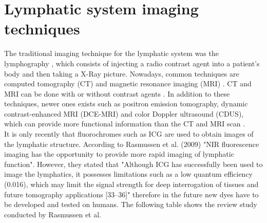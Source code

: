 \section{Lymphatic system imaging techniques}
The traditional imaging technique for the lymphatic system was the lymphography \cite{guermazi_lymphography:_2003}, which consists of injecting a radio contrast agent into a patient's body and then taking a X-Ray picture.  Nowadays, common techniques are computed tomography (CT) and magnetic resonance imaging (MRI) \cite{guermazi_lymphography:_2003,reinhardt_metastatic_2001}. CT and MRI can be done with or without contrast agents \cite{luciani_lymph_2006}. In addition to these techniques, newer ones  exists such as positron emission tomography, dynamic contrast-enhanced MRI (DCE-MRI) and color Doppler ultrasound (CDUS), which can provide more functional information than the CT and MRI scan \cite{barrett_imaging_2006}. \\

It is only recently that fluorochromes such as ICG are used to obtain images of the lymphatic structure. According to Rasmussen et al. (2009) \cite{rasmussen_lymphatic_2009} "NIR fluorescence imaging has the opportunity to provide more rapid imaging of lymphatic function". However, they stated that "Although ICG has successfully been used to image the lymphatics, it possesses limitations such as a low quantum efficiency (0.016), which may limit the signal strength for deep interrogation of tissues and future tomography applications [33–36]" therefore in the future new dyes have to be developed and tested on humans. The following table shows the review study conducted by Rasmussen et al. \cite{rasmussen_lymphatic_2009}

